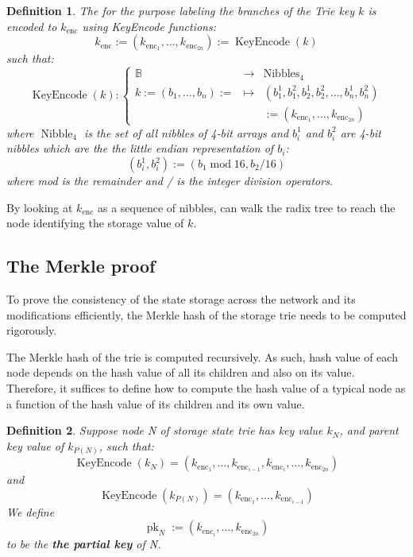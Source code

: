 \documentclass{article}
\newcommand{\assign}{:=}
\newcommand{\nosymbol}{}
\newcommand{\tmop}[1]{\ensuremath{\operatorname{#1}}}
\newcommand{\tmstrong}[1]{\textbf{#1}}
\newcommand{\tmtextbf}[1]{{\bfseries{#1}}}
\newtheorem{definition}{Definition}
\providecommand{\nosymbol}{}
\providecommand{\tmop}[1]{\ensuremath{\mathrm{#1}}}
\providecommand{\tmstrong}[1]{\tmtextbf{#1}}
\providecommand{\tmtextbf}[1]{\tmtextbf{#1}}
\newtheorem{definition}{Definition}
\begin{document}
\begin{definition}
  The for the purpose labeling the branches of the Trie key $k$ is encoded to
  $k_{\tmop{enc}}$ using KeyEncode functions:
  \begin{equation}
    k_{\tmop{enc}} \assign (k_{\tmop{enc}_1}, \ldots, k_{\tmop{enc}_{2 n}})
    \assign \tmop{KeyEncode} (k) \label{key-encode-in-trie}
  \end{equation}
  such that:
  \[ \tmop{KeyEncode} (k) : \left\{ \begin{array}{lll}
       \mathbb{B}^{\nosymbol} & \rightarrow & \tmop{Nibbles}_4\\
       k \assign (b_1, \ldots, b_n) \assign & \mapsto & (b^1_1, b^2_1, b_2^1,
       b^2_2, \ldots, b^1_n, b^2_n)\\
       &  & \assign (k_{\tmop{enc}_1}, \ldots, k_{\tmop{enc}_{2 n}})
     \end{array} \right. \]
  where $\tmop{Nibble}_4$ is the set of all nibbles of 4-bit arrays and
  $b^1_i$ and $b^2_i$ are 4-bit nibbles which are the the little endian
  representation of $b_i$:
  \[ (b^1_i, b^2_i) \assign (b_1 \tmop{mod} 16, b_2 / 16) \]
  where mod is the remainder and / is the integer division operators.
\end{definition}

By looking at $k_{\tmop{enc}}$ as a sequence of nibbles, can walk the radix
tree to reach the node identifying the storage value of $k$.

\subsection{The Merkle proof}\label{sect-merkl-proof}

To prove the consistency of the state storage across the network and its
modifications efficiently, the Merkle hash of the storage trie needs to be
computed rigorously.

The Merkle hash of the trie is computed recursively. As such, hash value of
each node depends on the hash value of all its children and also on its value.
Therefore, it suffices to define how to compute the hash value of a typical
node as a function of the hash value of its children and its own value.

\begin{definition}
  Suppose node N of storage state trie has key value $k_N$, and parent key
  value of $k_{P (N)}$, such that:
  \[ \tmop{KeyEncode} (k_N) = (k_{\tmop{enc}_1}, \ldots, k_{\tmop{enc}_{i -
     1}}, k_{\tmop{enc}_i}, \ldots, k_{\tmop{enc}_{2 n}}) \]
  and
  \[ \tmop{KeyEncode} (k_{P (N)}) = (k_{\tmop{enc}_1}, \ldots,
     k_{\tmop{enc}_{i - 1}}) \]
  We define
  \[ \tmop{pk}_N \assign (k_{\tmop{enc}_i}, \ldots, k_{\tmop{enc}_{2 n}}) \]
  to be the {\tmstrong{the partial key}} of N.
\end{definition}
\end{document}
